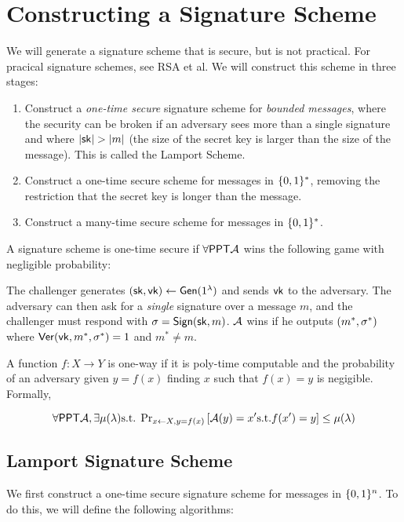 \section{Constructing a Signature Scheme}
We will generate a signature scheme that is secure, but is not practical. For pracical signature schemes, see RSA et al. We will construct this scheme in three stages:

\begin{enumerate}
	\item Construct a \emph{one-time secure} signature scheme for \emph{bounded messages}, where the security can be broken if an adversary sees more than a single signature and where $\left| {\mathsf{sk}} \right| > \left| m \right|$ (the size of the secret key is larger than the size of the message). This is called the Lamport Scheme. %
	\item Construct a one-time secure scheme for messages in $\{0,1\}^*$, removing the restriction that the secret key is longer than the message.
	\item Construct a many-time secure scheme for messages in $\{0,1\}^*$.
\end{enumerate}

\begin{definition}
	A signature scheme is one-time secure if $\forall \mathsf{PPT} \mathcal{A}$ wins the following game with negligible probability:

	The challenger generates $({\mathsf{sk}}, \mathsf{vk}) \leftarrow \mathsf{Gen}(1^\lambda)$ and sends $\mathsf{vk}$ to the adversary. The adversary can then ask for a \emph{single} signature over a message $m$, and the challenger must respond with $\sigma = \mathsf{Sign}({\mathsf{sk}}, m)$. $\mathcal{A}$ wins if he outputs $(m^*, \sigma^*)$ where $\mathsf{Ver}(\mathsf{vk}, m^*, \sigma^*) = 1$ and $m^* \neq m$.
\end{definition}


\begin{definition}
	A function $f: X \rightarrow Y$ is one-way if it is poly-time computable and the probability of an adversary given $y=f(x)$ finding $x$ such that $f(x) = y$ is negigible. Formally,

	\[ \forall \mathsf{PPT} \mathcal{A}, \exists \mu(\lambda) \text{s.t. } \text{Pr}_{x \leftarrow X, y = f(x)}\left[\mathcal{A}(y) = x' \text{s.t.} f(x')=y\right] \leq \mu(\lambda) \]
\end{definition}

\subsection{Lamport Signature Scheme}
We first construct a one-time secure signature scheme for messages in $\{0,1\}^n$. To do this, we will define the following algorithms:


